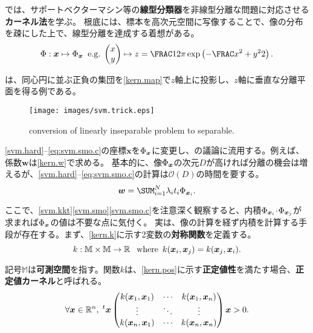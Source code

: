 \documentclass[10pt,a4paper]{book}
\begin{document}
では、サポートベクターマシン等の\textbf{線型分類器}を非線型分離な問題に対応させる\textbf{カーネル法}を学ぶ。
根底には、標本を高次元空間に写像することで、像の分布を疎にした上で、線型分離を達成する着想がある。
%
\begin{equation}
\label{eq:kern.map}
\Phi: \bm{x} \mapsto \Phiz\;\;
\mathrm{e.g.}\;
\begin{pmatrix}x\\y\end{pmatrix} \mapsto z=\frac{1}{2\pi} \exp \left(-\frac{x^2 + y^2}{2}\right).
\end{equation}

は、同心円に並ぶ正負の集団を\eqref{kern.map}で$z$軸上に投影し、$z$軸に垂直な分離平面を得る例である。

\begin{figure}[h]
\centering
\texttt{[image: images/svm.trick.eps]}
\caption{conversion of linearly inseparable problem to separable.\label{fig:svm.trick}}
\end{figure}

\eqref{svm.hard}--\ref{eq:svm.smo.c}の座標$\bm{x}$を$\Phi_{\bm{x}}$に変更し、の議論に流用する。例えば、係数$\bm{w}$は\eqref{kern.w}で求める。
基本的に、像$\Phi_{\bm{x}}$の次元$D$が高ければ分離の機会は増えるが、\eqref{svm.hard}--\ref{eq:svm.smo.c}の計算は$\mathcal{O}(D)$の時間を要する。
%
\begin{equation}
\label{eq:kern.w}
\bm{w} = \sum_{i=1}^N \lambda_i t_i \Phix{i}.
\end{equation}

ここで、\eqref{svm.kkt}\eqref{svm.smo}\eqref{svm.smo.c}を注意深く観察すると、内積$\Phi_{\bm{x}_{i}}\! \cdot \!\Phi_{\bm{x}_{j}}$が求まれば$\Phi_{\bm{x}}$の値は不要な点に気付く。
実は、像の計算を経ず内積を計算する手段が存在する。まず、\eqref{kern.k}に示す2変数の\textbf{対称関数}を定義する。
%
\begin{equation}
\label{eq:kern.k}
k: \mathbb{M} \times \mathbb{M} \to \mathbb{R}\;\enspace\mathrm{where}\enspace k(\bm{x}_i,\bm{x}_j) = k(\bm{x}_j,\bm{x}_i).
\end{equation}

記号$\mathbb{M}$は\textbf{可測空間}を指す。関数$k$は、\eqref{kern.pos}に示す\textbf{正定値性}を満たす場合、\textbf{正定値カーネル}と呼ばれる。
%
\begin{equation}
\label{eq:kern.pos}
\forall \bm{x}\in\mathbb{R}^n,\;
{}^t\bm{x}
\begin{pmatrix}
k(\bm{x}_1,\bm{x}_1) & \cdots & k(\bm{x}_1,\bm{x}_n) \\
\vdots & \ddots & \vdots \\
k(\bm{x}_n,\bm{x}_1) & \cdots & k(\bm{x}_n,\bm{x}_n) \\
\end{pmatrix}
\bm{x} > 0.
\end{equation}
\end{document}
